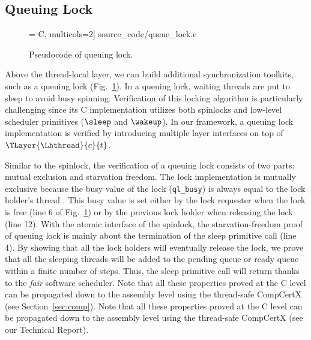 \subsection{Queuing Lock}\label{subsec:qlockimplementation}

\begin{figure}
\vspace{-30pt}
 = C, multicols=2] {source_code/queue_lock.c}
\vspace{-17pt}
\caption{Pseudocode of queuing lock.}
\label{fig:exp:qlock}
\vspace{-8pt}
\end{figure}
Above the thread-local layer,
we can build additional synchronization toolkits, such as
a queuing lock (\cf Fig.~\ref{fig:exp:qlock}).
In a queuing lock, waiting threads are put to sleep to avoid busy spinning.
Verification of this locking algorithm is particularly
challenging since its C implementation utilizes both
spinlocks and low-level scheduler primitives ($\sleep$ and $\wakeup$).
In our framework, a queuing lock implementation is verified
by introducing multiple layer interfaces on top of $\TLayer{\Lhthread}{c}{t}$.

Similar to the spinlock,
the verification of a queuing lock consists of
two parts: mutual exclusion and starvation freedom.
The lock implementation is mutually exclusive
because the busy value of the lock (\texttt{ql\_busy})
is always equal to the lock holder's thread \allid{}.
This busy value is set either
by the lock requester when the lock is free (line 6 of 
Fig.~\ref{fig:exp:qlock})
or by the previous lock holder when releasing the lock
(line 12).
With the atomic interface of the spinlock, the starvation-freedom proof of queuing lock
is mainly about the termination of the sleep primitive call
(line 4). By showing that all the lock holders
will eventually release the lock,
we prove that all the sleeping threads will be 
added to the pending queue or ready queue within a finite number
of steps. Thus, the sleep primitive call will return
thanks to the \emph{fair} software scheduler.
\ifTRthen
Note that all these properties proved at the C level can be propagated down to the assembly level using the thread-safe CompCertX (see Section~\ref{sec:comp}).
\else
Note that all these properties proved at the C level can be propagated down to the assembly level using the thread-safe CompCertX (see our Technical Report).
\fi

\vspace{-5pt}
